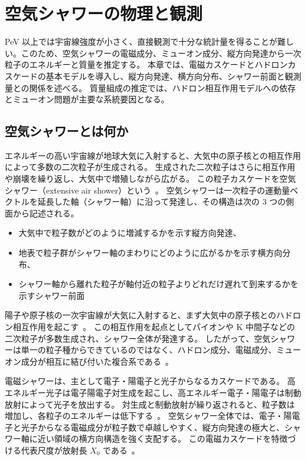 \documentclass[book,paper=a4,fontsize=11pt]{jlreq}
\begin{document}
\chapter{空気シャワーの物理と観測}\label{chap:air_shower}
PeV 以上では宇宙線強度が小さく、直接観測で十分な統計量を得ることが難しい。このため、空気シャワーの電磁成分、ミューオン成分、縦方向発達から一次粒子のエネルギーと質量を推定する。
本章では、電磁カスケードとハドロンカスケードの基本モデルを導入し、縦方向発達、横方向分布、シャワー前面と観測量との関係を述べる。
質量組成の推定では、ハドロン相互作用モデルへの依存とミューオン問題が主要な系統要因となる。

\section{空気シャワーとは何か}\label{sec:air_shower_overview}
エネルギーの高い宇宙線が地球大気に入射すると、大気中の原子核との相互作用によって多数の二次粒子が生成される。
生成された二次粒子はさらに相互作用や崩壊を繰り返し、大気中で増殖しながら広がる。
この粒子カスケードを空気シャワー（extensive air shower）という~\cite{PDGCosmicRays,Stanev2004}。
空気シャワーは一次粒子の運動量ベクトルを延長した軸（シャワー軸）に沿って発達し、その構造は次の 3 つの側面から記述される。
\begin{itemize}
  \item 大気中で粒子数がどのように増減するかを示す縦方向発達、
  \item 地表で粒子群がシャワー軸のまわりにどのように広がるかを示す横方向分布、
  \item シャワー軸から離れた粒子が軸付近の粒子よりどれだけ遅れて到来するかを示すシャワー前面
\end{itemize}

陽子や原子核の一次宇宙線が大気に入射すると、まず大気中の原子核とのハドロン相互作用を起こす~\cite{PDGCosmicRays,Matthews2005}。
この相互作用を起点としてパイオンや K 中間子などの二次粒子が多数生成され、シャワー全体が発達する。
したがって、空気シャワーは単一の粒子種からできているのではなく、ハドロン成分、電磁成分、ミューオン成分が相互に結び付いた複合系である~\cite{Matthews2005,Stanev2004}。

電磁シャワーは、主として電子・陽電子と光子からなるカスケードである。
高エネルギー光子は電子陽電子対生成を起こし、高エネルギー電子・陽電子は制動放射によって光子を放出する。
対生成と制動放射が繰り返されると、粒子数は増加し、各粒子のエネルギーは低下する~\cite{PDGPassage,Heitler1944}。
空気シャワー全体では、電子・陽電子と光子からなる電磁成分が粒子数で卓越しやすく、縦方向発達の極大と、シャワー軸に近い領域の横方向構造を強く支配する。
この電磁カスケードを特徴づける代表尺度が放射長 \(X_0\) である~\cite{PDGPassage,PDGAir}。
\end{document}
